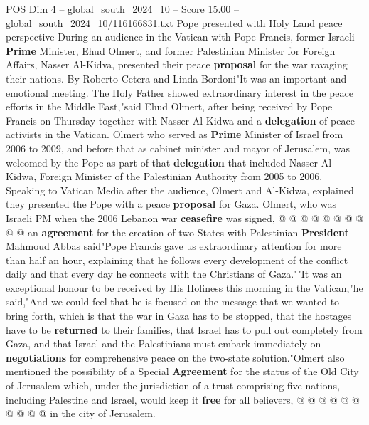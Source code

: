 \begin{textsample}{POS Dim 4 – global\_south\_2024\_10 – Score 15.00 – global\_south\_2024\_10/116166831.txt}  \label{ex:f4_pos_388}
Pope presented with Holy Land peace perspective During an audience in the Vatican with Pope Francis, former Israeli \textbf{Prime} Minister, Ehud Olmert, and former Palestinian Minister for Foreign Affairs, Nasser Al-Kidva, presented their peace \textbf{proposal} for the war ravaging their nations.
By Roberto Cetera and Linda Bordoni"It was an important and emotional meeting.
The Holy Father showed extraordinary interest in the peace efforts in the Middle East,"said Ehud Olmert, after being received by Pope Francis on Thursday together with Nasser Al-Kidwa and a \textbf{delegation} of peace activists in the Vatican.
Olmert who served as \textbf{Prime} Minister of Israel from 2006 to 2009, and before that as cabinet minister and mayor of Jerusalem, was welcomed by the Pope as part of that \textbf{delegation} that included Nasser Al-Kidwa, Foreign Minister of the Palestinian Authority from 2005 to 2006.
Speaking to Vatican Media after the audience, Olmert and Al-Kidwa, explained they presented the Pope with a peace \textbf{proposal} for Gaza.
Olmert, who was Israeli PM when the 2006 Lebanon war \textbf{ceasefire} was signed, @ @ @ @ @ @ @ @ @ @ an \textbf{agreement} for the creation of two States with Palestinian \textbf{President} Mahmoud Abbas said"Pope Francis gave us extraordinary attention for more than half an hour, explaining that he follows every development of the conflict daily and that every day he connects with the Christians of Gaza.""It was an exceptional honour to be received by His Holiness this morning in the Vatican,"he said,"And we could feel that he is focused on the message that we wanted to bring forth, which is that the war in Gaza has to be stopped, that the hostages have to be \textbf{returned} to their families, that Israel has to pull out completely from Gaza, and that Israel and the Palestinians must embark immediately on \textbf{negotiations} for comprehensive peace on the two-state solution."Olmert also mentioned the possibility of a Special \textbf{Agreement} for the status of the Old City of Jerusalem which, under the jurisdiction of a trust comprising five nations, including Palestine and Israel, would keep it \textbf{free} for all believers, @ @ @ @ @ @ @ @ @ @ in the city of Jerusalem.

\end{textsample}

